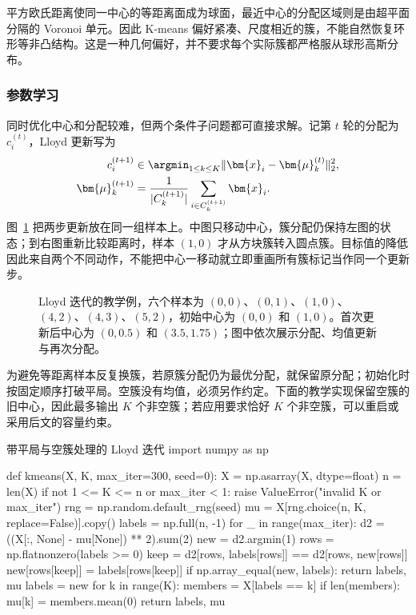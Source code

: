 平方欧氏距离使同一中心的等距离面成为球面，最近中心的分配区域则是由超平面分隔的 Voronoi 单元。因此 K-means 偏好紧凑、尺度相近的簇，不能自然恢复环形等非凸结构。这是一种几何偏好，并不要求每个实际簇都严格服从球形高斯分布。

\subsubsection{参数学习}

同时优化中心和分配较难，但两个条件子问题都可直接求解。记第 $t$ 轮的分配为 $c_i^{(t)}$，Lloyd 更新写为
\begin{align}
  c_i^{(t+1)}
    &\in\argmin_{1\leq k\leq K}
      \lVert\bm{x}_i-\bm{\mu}_k^{(t)}\rVert_2^2,
      \label{eq:clustering-lloyd-assignment}\\
  \bm{\mu}_k^{(t+1)}
    &=\frac{1}{|C_k^{(t+1)}|}
      \sum_{i\in C_k^{(t+1)}}\bm{x}_i.
      \label{eq:clustering-lloyd-centre}
\end{align}
图~\ref{fig:clustering-lloyd-steps} 把两步更新放在同一组样本上。中图只移动中心，簇分配仍保持左图的状态；到右图重新比较距离时，样本 $(1,0)$ 才从方块簇转入圆点簇。目标值的降低因此来自两个不同动作，不能把中心一移动就立即重画所有簇标记当作同一个更新步。

\Needspace{65mm}
\begin{figure}[htbp]
 \centering
 
 \caption{Lloyd 迭代的教学例，六个样本为 $(0,0)$、$(0,1)$、$(1,0)$、$(4,2)$、$(4,3)$、$(5,2)$，初始中心为 $(0,0)$ 和 $(1,0)$。首次更新后中心为 $(0,0.5)$ 和 $(3.5,1.75)$；图中依次展示分配、均值更新与再次分配。}
 \label{fig:clustering-lloyd-steps}
\end{figure}

为避免等距离样本反复换簇，若原簇分配仍为最优分配，就保留原分配；初始化时按固定顺序打破平局。空簇没有均值，必须另作约定。下面的教学实现保留空簇的旧中心，因此最多输出 $K$ 个非空簇；若应用要求恰好 $K$ 个非空簇，可以重启或采用后文的容量约束。

\begin{codeblock}[language=Python,label={code:clustering-kmeans}]{带平局与空簇处理的 Lloyd 迭代}
import numpy as np

def kmeans(X, K, max_iter=300, seed=0):
    X = np.asarray(X, dtype=float)
    n = len(X)
    if not 1 <= K <= n or max_iter < 1:
        raise ValueError("invalid K or max_iter")
    rng = np.random.default_rng(seed)
    mu = X[rng.choice(n, K, replace=False)].copy()
    labels = np.full(n, -1)
    for _ in range(max_iter):
        d2 = ((X[:, None] - mu[None]) ** 2).sum(2)
        new = d2.argmin(1)
        rows = np.flatnonzero(labels >= 0)
        keep = d2[rows, labels[rows]] == d2[rows, new[rows]]
        new[rows[keep]] = labels[rows[keep]]
        if np.array_equal(new, labels):
            return labels, mu
        labels = new
        for k in range(K):
            members = X[labels == k]
            if len(members):
                mu[k] = members.mean(0)
    return labels, mu
\end{codeblock}

